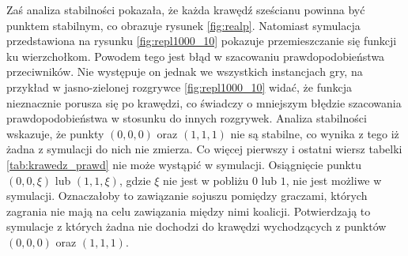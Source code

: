 Zaś analiza stabilności pokazała, że każda krawędź sześcianu powinna być punktem stabilnym, co obrazuje rysunek \ref{fig:realp}. Natomiast symulacja przedstawiona na rysunku \ref{fig:repl1000_10} pokazuje przemieszczanie się funkcji ku wierzchołkom. Powodem tego jest błąd w szacowaniu prawdopodobieństwa przeciwników. Nie występuje on jednak we wszystkich instancjach gry, na przykład w jasno-zielonej rozgrywce \ref{fig:repl1000_10} widać, że funkcja nieznacznie porusza się po krawędzi, co świadczy o mniejszym błędzie szacowania prawdopodobieństwa w stosunku do innych rozgrywek. Analiza stabilności wskazuje, że punkty $(0,0,0)$ oraz $(1,1,1)$ nie są stabilne, co wynika z tego iż żadna z symulacji do nich nie zmierza. Co więcej pierwszy i ostatni wiersz tabelki \ref{tab:krawedz_prawd} nie może wystąpić w symulacji. Osiągnięcie punktu $(0,0,\xi )$ lub $(1,1,\xi )$, gdzie $\xi$ nie jest w pobliżu $0$ lub $1$, nie jest możliwe w symulacji. Oznaczałoby to zawiązanie sojuszu pomiędzy graczami, których zagrania nie mają na celu zawiązania między nimi koalicji. Potwierdzają to symulacje z których żadna nie dochodzi do krawędzi wychodzących z punktów $(0,0,0)$ oraz $(1,1,1)$.


